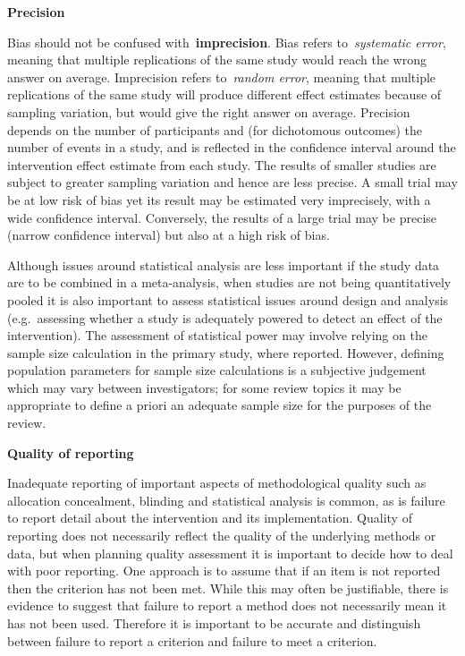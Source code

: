 \documentclass[
  10pt,
  a4paper,
  DIV=11,
  numbers=noendperiod]{scrreprt}
\begin{document}
\textbf{Precision}

Bias should not be confused with~\textbf{imprecision}. Bias refers
to~\emph{systematic error}, meaning that multiple replications of the
same study would reach the wrong answer on average. Imprecision refers
to~\emph{random error}, meaning that multiple replications of the same
study will produce different effect estimates because of sampling
variation, but would give the right answer on average. Precision depends
on the number of participants and (for dichotomous outcomes) the number
of events in a study, and is reflected in the confidence interval around
the intervention effect estimate from each study. The results of smaller
studies are subject to greater sampling variation and hence are less
precise. A small trial may be at low risk of bias yet its result may be
estimated very imprecisely, with a wide confidence interval. Conversely,
the results of a large trial may be precise (narrow confidence interval)
but also at a high risk of bias.

Although issues around statistical analysis are less important if the
study data are to be combined in a meta-analysis, when studies are not
being quantitatively pooled it is also important to assess statistical
issues around design and analysis (e.g.~assessing whether a study is
adequately powered to detect an effect of the intervention). The
assessment of statistical power may involve relying on the sample size
calculation in the primary study, where reported. However, defining
population parameters for sample size calculations is a subjective
judgement which may vary between investigators; for some review topics
it may be appropriate to define a priori an adequate sample size for the
purposes of the review.

\textbf{Quality of reporting}

Inadequate reporting of important aspects of methodological quality such
as allocation concealment, blinding and statistical analysis is common,
as is failure to report detail about the intervention and its
implementation. Quality of reporting does not necessarily reflect the
quality of the underlying methods or data, but when planning quality
assessment it is important to decide how to deal with poor reporting.
One approach is to assume that if an item is not reported then the
criterion has not been met. While this may often be justifiable, there
is evidence to suggest that failure to report a method does not
necessarily mean it has not been used. Therefore it is important to be
accurate and distinguish between failure to report a criterion and
failure to meet a criterion.
\end{document}
